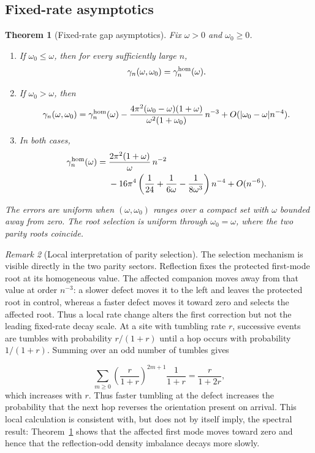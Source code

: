\documentclass[twoside,10pt]{article}
\numberwithin{equation}{section}
\theoremstyle{slbody}
\newtheorem{theorem}{Theorem}[section]
\theoremstyle{definition}
\theoremstyle{remark}
\newtheorem{remark}[theorem]{Remark}
\begin{document}
\subsection{Fixed-rate asymptotics}

\begin{theorem}[Fixed-rate gap asymptotics]\label{thm:fixed-gap}
Fix $\omega>0$ and $\omega_0\ge0$.
\begin{enumerate}
\item If $\omega_0\le\omega$, then for every sufficiently large $n$,
  \begin{equation}\label{eq:slow-defect-gap}
    \gamma_n(\omega,\omega_0)=\gamma_n^{\rm hom}(\omega).
  \end{equation}
\item If $\omega_0>\omega$, then
  \begin{equation}\label{eq:fast-defect-gap}
 \gamma_n(\omega,\omega_0)
  =\gamma_n^{\rm hom}(\omega)
   -\frac{4\pi^2(\omega_0-\omega)(1+\omega)}
          {\omega^2(1+\omega_0)}\,n^{-3}
    +O(|\omega_0-\omega|n^{-4}).
  \end{equation}
\item In both cases,
  \begin{align}
  \gamma_n^{\rm hom}(\omega)
   ={}&\frac{2\pi^2(1+\omega)}{\omega}\,n^{-2}\notag\\
    &-16\pi^4\left(\frac1{24}+\frac1{6\omega}
                    -\frac1{8\omega^3}\right)n^{-4}
      +O(n^{-6}).\label{eq:hom-gap-expansion}
  \end{align}
\end{enumerate}
The errors are uniform when $(\omega,\omega_0)$ ranges over a compact
set with $\omega$ bounded away from zero.  The root selection is uniform
through $\omega_0=\omega$, where the two parity roots coincide.
\end{theorem}

\begin{remark}[Local interpretation of parity selection]
The selection mechanism is visible directly in the two parity sectors.
Reflection fixes the protected first-mode root at its homogeneous value.
The affected companion moves away from that value at order $n^{-3}$:
a slower defect moves it to the left and leaves the protected root in
control, whereas a faster defect moves it toward zero and selects the
affected root.  Thus a local rate change alters the first correction but
not the leading fixed-rate decay scale.  At a site with tumbling rate $r$,
successive events are tumbles with probability $r/(1+r)$ until a hop occurs
with probability $1/(1+r)$.  Summing over an odd number of tumbles gives

\[
 \sum_{m\geq0}\left(\frac{r}{1+r}\right)^{2m+1}\frac1{1+r}
 =\frac{r}{1+2r},
\]
which increases with $r$.  Thus faster tumbling at the defect increases the
probability that the next hop reverses the orientation present on arrival.
This local calculation is consistent
with, but does not by itself imply, the spectral result: Theorem~\ref{thm:fixed-gap}
shows that the affected first mode moves toward zero and hence that the
reflection-odd density imbalance decays more slowly.
\end{remark}
\end{document}
